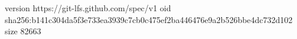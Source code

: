 version https://git-lfs.github.com/spec/v1
oid sha256:b141c304da5f3e733ea3939c7cb0c475ef2ba446476e9a2b526bbe4dc732d102
size 82663
